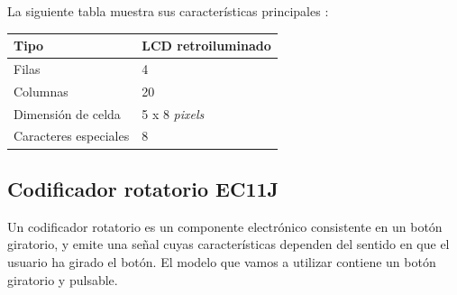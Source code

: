 \smallskip

La siguiente tabla muestra sus características principales \cite{datasheet_lcd}:

\smallskip

\begin{center}
	\begin{tabular}{|l|l|}
		\hline Tipo & \acrshort{LCD} retroiluminado \\ 
		\hline Filas & 4 \\ 
		\hline Columnas & 20 \\ 
		\hline Dimensión de celda & 5 x 8 \textit{pixels} \\ 
		\hline Caracteres especiales & 8 \\ 
		\hline 
	\end{tabular}
	\smallskip
\end{center} 

\smallskip

\subsection{Codificador rotatorio EC11J}

Un codificador rotatorio es un componente electrónico consistente en un botón giratorio, y emite una señal cuyas características dependen del sentido en que el usuario ha girado el botón. El modelo que vamos a utilizar contiene un botón giratorio y pulsable. \cite{rotary}

\smallskip

